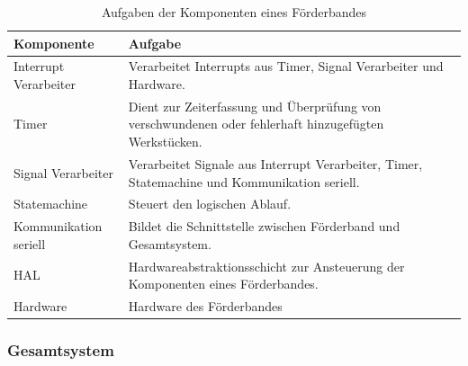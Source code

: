 \documentclass[a4paper, 11pt]{article}
\begin{document}
\begin{table}[H]
\center
    \begin{tabularx}{\textwidth}{|l|X|}
        \hline
        \textbf{Komponente}&\textbf{Aufgabe}\\
        \hline
        Interrupt Verarbeiter&Verarbeitet Interrupts aus Timer, Signal Verarbeiter und Hardware.\\
        \hline
        Timer&Dient zur Zeiterfassung und Überprüfung von verschwundenen oder fehlerhaft hinzugefügten 
        Werkstücken.\\
        \hline
        Signal Verarbeiter&Verarbeitet Signale aus Interrupt Verarbeiter, Timer, Statemachine und Kommunikation seriell.\\
        \hline
        Statemachine&Steuert den logischen Ablauf.\\
        \hline
        Kommunikation seriell&Bildet die Schnittstelle zwischen Förderband und Gesamtsystem.\\
        \hline
        HAL&Hardwareabstraktionsschicht zur Ansteuerung der Komponenten eines Förderbandes.\\
        \hline
        Hardware&Hardware des Förderbandes\\
        \hline
        \end{tabularx}
    \caption{Aufgaben der Komponenten eines Förderbandes}
    \label{archinterntcomp}
\end{table}

\newpage

\subsubsection{Gesamtsystem}
\end{document}
